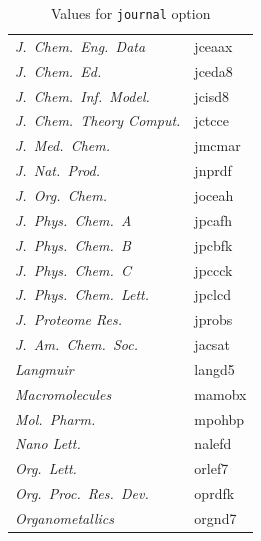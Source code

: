 \documentclass[english,journal=jctcce,etalmode=truncate,maxauthors=0]{achemso}
\begin{document}
\begin{table}
\begin{tabular}{>{\itshape}l>{\ttfamily}l}
      J.~Chem.\ Eng.\ Data     & jceaax  \\
      J.~Chem.\ Ed.            & jceda8  \\
      J.~Chem.\ Inf.\ Model.   & jcisd8  \\
      J.~Chem.\ Theory Comput. & jctcce  \\
      J.~Med.\ Chem.           & jmcmar  \\
      J.~Nat.\ Prod.           & jnprdf  \\
      J.~Org.\ Chem.           & joceah  \\
      J.~Phys.\ Chem.~A        & jpcafh  \\
      J.~Phys.\ Chem.~B        & jpcbfk  \\
      J.~Phys.\ Chem.~C        & jpccck  \\
      J.~Phys.\ Chem.\ Lett.   & jpclcd  \\
      J.~Proteome Res.         & jprobs  \\
      J.~Am.\ Chem.\ Soc.      & jacsat  \\
      Langmuir                 & langd5  \\
      Macromolecules           & mamobx  \\
      Mol.\ Pharm.             & mpohbp  \\
      Nano Lett.               & nalefd  \\
      Org.\ Lett.              & orlef7  \\
      Org.\ Proc.\ Res.\ Dev.  & oprdfk  \\
      Organometallics          & orgnd7  \\
    \bottomrule
  \end{tabular}
  \caption{Values for \texttt{journal} option}
  \label{tab:journal}
\end{table}

\end{document}
